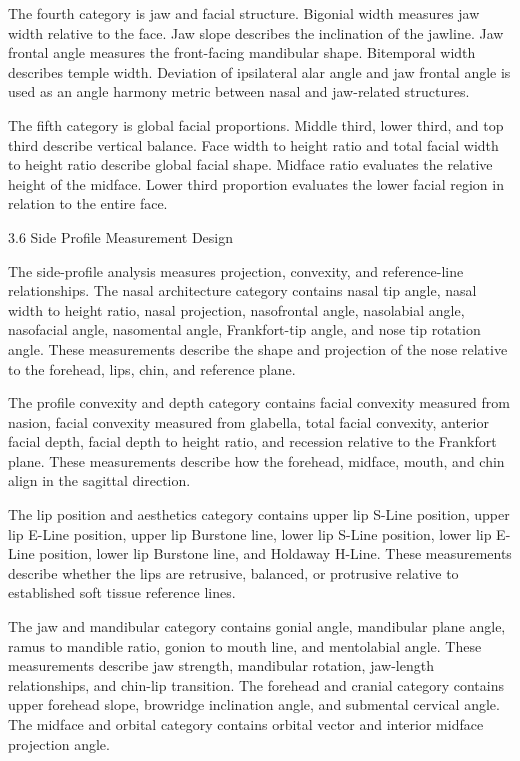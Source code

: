 The fourth category is jaw and facial structure. Bigonial width measures jaw width relative to the face. Jaw slope describes the inclination of the jawline. Jaw frontal angle measures the front-facing mandibular shape. Bitemporal width describes temple width. Deviation of ipsilateral alar angle and jaw frontal angle is used as an angle harmony metric between nasal and jaw-related structures.

The fifth category is global facial proportions. Middle third, lower third, and top third describe vertical balance. Face width to height ratio and total facial width to height ratio describe global facial shape. Midface ratio evaluates the relative height of the midface. Lower third proportion evaluates the lower facial region in relation to the entire face.

3.6  Side Profile Measurement Design

The side-profile analysis measures projection, convexity, and reference-line relationships. The nasal architecture category contains nasal tip angle, nasal width to height ratio, nasal projection, nasofrontal angle, nasolabial angle, nasofacial angle, nasomental angle, Frankfort-tip angle, and nose tip rotation angle. These measurements describe the shape and projection of the nose relative to the forehead, lips, chin, and reference plane.

The profile convexity and depth category contains facial convexity measured from nasion, facial convexity measured from glabella, total facial convexity, anterior facial depth, facial depth to height ratio, and recession relative to the Frankfort plane. These measurements describe how the forehead, midface, mouth, and chin align in the sagittal direction.

The lip position and aesthetics category contains upper lip S-Line position, upper lip E-Line position, upper lip Burstone line, lower lip S-Line position, lower lip E-Line position, lower lip Burstone line, and Holdaway H-Line. These measurements describe whether the lips are retrusive, balanced, or protrusive relative to established soft tissue reference lines.

The jaw and mandibular category contains gonial angle, mandibular plane angle, ramus to mandible ratio, gonion to mouth line, and mentolabial angle. These measurements describe jaw strength, mandibular rotation, jaw-length relationships, and chin-lip transition. The forehead and cranial category contains upper forehead slope, browridge inclination angle, and submental cervical angle. The midface and orbital category contains orbital vector and interior midface projection angle.

